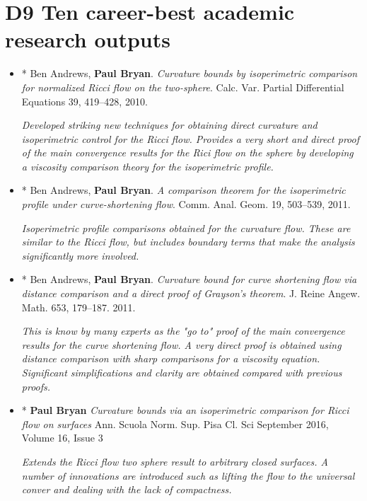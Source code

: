 \documentclass[12pt]{article}
\author{Paul Bryan}
\date{\today}
\title{}
\begin{document}
\tableofcontents

\section{D9 Ten career-best academic research outputs}
\label{sec:orgheadline1}

\begin{itemize}
\item * Ben Andrews, \textbf{Paul Bryan}. \emph{Curvature bounds by isoperimetric comparison for normalized Ricci flow on the two-sphere}. Calc. Var. Partial Differential Equations 39, 419--428, 2010.

\emph{Developed striking new techniques for obtaining direct curvature and isoperimetric control for the Ricci flow. Provides a very short and direct proof of the main convergence results for the Rici flow on the sphere by developing a viscosity comparison theory for the isoperimetric profile.}

\item * Ben Andrews, \textbf{Paul Bryan}. \emph{A comparison theorem for the isoperimetric profile under curve-shortening flow}. Comm. Anal. Geom. 19, 503--539, 2011.

\emph{Isoperimetric profile comparisons obtained for the curvature flow. These are similar to the Ricci flow, but includes boundary terms that make the analysis significantly more involved.}

\item * Ben Andrews, \textbf{Paul Bryan}. \emph{Curvature bound for curve shortening flow via distance comparison and a direct proof of Grayson's theorem}. J. Reine Angew. Math. 653, 179--187. 2011.

\emph{This is know by many experts as the "go to" proof of the main convergence results for the curve shortening flow. A very direct proof is obtained using distance comparison with sharp comparisons for a viscosity equation. Significant simplifications and clarity are obtained compared with previous proofs.}

\item * \textbf{Paul Bryan} \emph{Curvature bounds via an isoperimetric comparison for Ricci flow on surfaces} Ann. Scuola Norm. Sup. Pisa Cl. Sci September 2016, Volume 16, Issue 3

\emph{Extends the Ricci flow two sphere result to arbitrary closed surfaces. A number of innovations are introduced such as lifting the flow to the universal conver and dealing with the lack of compactness.}


\end{itemize}
\end{document}
